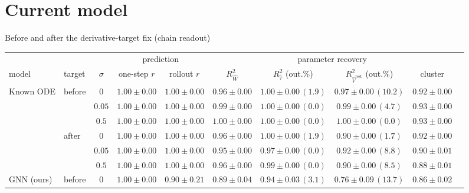 \documentclass[aspectratio=169]{beamer}
\newcommand{\good}[1]{\textcolor{goodgreen}{#1}}
\begin{document}
\section{Current model}
\begin{frame}{Before and after the derivative-target fix \textnormal{\small(chain readout)}}
\label{sl:beforeafter}
\vspace{0.2cm}
\centering\tiny
\setlength{\tabcolsep}{3.5pt}
\begin{tabular}{llcccccccc}
\toprule
 & & & \multicolumn{2}{c}{prediction} & \multicolumn{4}{c}{parameter recovery} \\
\cmidrule(lr){4-5}\cmidrule(lr){6-9}
model & target & $\sigma$ & one-step $r$ & rollout $r$
  & $R^2_{\hat W}$ & $R^2_{\hat\tau}$ (out.\%) & $R^2_{\hat V^{\mathrm{rest}}}$ (out.\%)
  & cluster \\
\midrule
Known ODE & before & $0$    & \good{$1.00{\pm}0.00$} & \good{$1.00{\pm}0.00$} & \good{$0.96{\pm}0.00$} & \good{$1.00{\pm}0.00\,(1.9)$} & \good{$0.97{\pm}0.00\,(10.2)$} & \good{$0.92{\pm}0.00$} \\
          &        & $0.05$ & \good{$1.00{\pm}0.00$} & \good{$1.00{\pm}0.00$} & \good{$0.99{\pm}0.00$} & \good{$1.00{\pm}0.00\,(0.0)$} & \good{$0.99{\pm}0.00\,(4.7)$}  & \good{$0.93{\pm}0.00$} \\
          &        & $0.5$  & \good{$1.00{\pm}0.00$} & \good{$1.00{\pm}0.00$} & \good{$1.00{\pm}0.00$} & \good{$1.00{\pm}0.00\,(0.0)$} & \good{$1.00{\pm}0.00\,(0.0)$}  & \good{$0.93{\pm}0.00$} \\
\cmidrule(lr){2-9}
          & after  & $0$    & \good{$1.00{\pm}0.00$} & \good{$1.00{\pm}0.00$} & \good{$0.96{\pm}0.00$} & \good{$1.00{\pm}0.00\,(1.9)$} & $0.90{\pm}0.00\,(1.7)$ & \good{$0.92{\pm}0.00$} \\
          &        & $0.05$ & \good{$1.00{\pm}0.00$} & \good{$1.00{\pm}0.00$} & \good{$0.95{\pm}0.00$} & \good{$0.97{\pm}0.00\,(0.0)$} & \good{$0.92{\pm}0.00\,(8.8)$} & \good{$0.90{\pm}0.01$} \\
          &        & $0.5$  & \good{$1.00{\pm}0.00$} & \good{$1.00{\pm}0.00$} & \good{$0.96{\pm}0.00$} & \good{$0.99{\pm}0.00\,(0.0)$} & $0.90{\pm}0.00\,(8.5)$ & $0.88{\pm}0.01$ \\
\midrule
GNN (ours) & before & $0$    & \good{$1.00{\pm}0.00$} & $0.90{\pm}0.21$ & $0.89{\pm}0.04$ & \good{$0.94{\pm}0.03\,(3.1)$} & $0.76{\pm}0.09\,(13.7)$ & $0.86{\pm}0.02$ \\

\end{tabular}
\end{frame}
\end{document}
